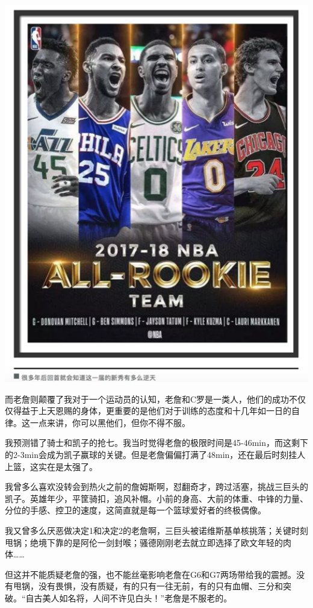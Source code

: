 \documentclass[]{book}
\begin{document}
\includegraphics[width=6.71in]{images/nba6}

而老詹则颠覆了我对于一个运动员的认知，老詹和C罗是一类人，他们的成功不仅仅得益于上天恩赐的身体，更重要的是他们对于训练的态度和十几年如一日的自律。这一点来讲，你可以黑他们，但你不得不服。

我预测错了骑士和凯子的抢七。我当时觉得老詹的极限时间是45-46min，而这剩下的2-3min会成为凯子赢球的关键。但是老詹偏偏打满了48min，还在最后时刻挂人上篮，这实在是太强了。

我曾多么喜欢没转会到热火之前的詹姆斯啊，怼翻奇才，跨过活塞，挑战三巨头的凯子。英雄年少，平筐骑扣，追风补帽。小前的身高、大前的体重、中锋的力量、分位的手感、控卫的速度，这简直就是每一个篮球爱好者的终极偶像。

我又曾多么厌恶做决定1和决定2的老詹啊，三巨头被诺维斯基单核挑落；关键时刻甩锅；绝境下靠的是阿伦一剑封喉；骚德刚刚老去就立即选择了欧文年轻的肉体\ldots{}\ldots{}

但这并不能质疑老詹的强，也不能丝毫影响老詹在G6和G7两场带给我的震撼。没有甩锅，没有畏惧，没有质疑，有的只有一往无前，有的只有血帽、三分和突破。``自古美人如名将，人间不许见白头！''老詹是不服老的。
\end{document}

